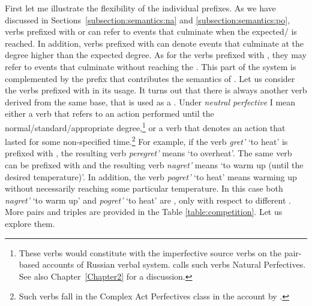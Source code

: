 First let me illustrate the flexibility of the individual prefixes. As we have discussed in Sections~\ref{subsection:semantics:na} and \ref{subsection:semantics:po}, verbs prefixed with  or  can refer to events that culminate when the expected/ is reached. In addition, verbs prefixed with  can denote events that culminate at the degree higher than the expected degree. As for the verbs prefixed with , they may refer to events that culminate without reaching the . This part of the  system is complemented by the prefix  that contributes the semantics of . Let us consider the verbs prefixed with  in its  usage. It turns out that there is always another verb derived from the same base, that is used as a . Under \textit{neutral perfective} I mean either a verb that refers to an action performed until the normal/standard/appropriate degree,\footnote{These verbs would constitute  with the imperfective source verbs on the pair-based accounts of Russian verbal system. \citet{Janda:07a} calls such verbs Natural Perfectives. See also Chapter~\ref{Chapter2} for a discussion.} or a verb that denotes an action that lasted for some non-specified time.\footnote{Such verbs fall in the Complex Act Perfectives class in the account by \citet{Janda:07a}.} For example, if the verb \textit{gret'} `to heat' is prefixed with , the resulting verb \textit{peregret'} means `to overheat'. The same verb can be prefixed with  and the resulting verb \textit{nagret'} means `to warm up (until the desired temperature)'. In addition, the verb \textit{pogret'} `to heat' means warming up without necessarily reaching some particular temperature. In this case both \textit{nagret'} `to warm up'  and \textit{pogret'} `to heat' are , only with respect to different . More pairs and triples are provided in the Table \ref{table:competition}. Let us explore them. 

